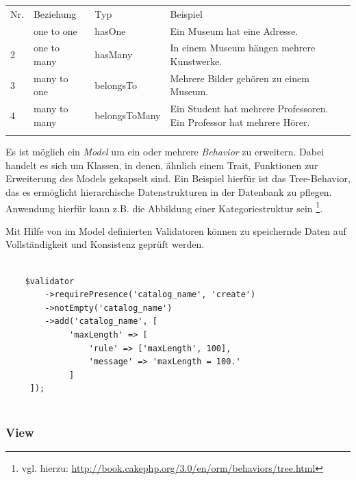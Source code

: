 	\begin{table}[!htbp]
		\begin{tabularx}{\textwidth}{p{1cm} X X p{8cm}}
			\cline{2-4}
			\rowcolor[HTML]{EFEFEF} 
			 Nr. & Beziehung & Typ & Beispiel \\ \cline{1-4} \addlinespace
			1 & one to one & hasOne & Ein Museum hat eine Adresse. \\
			2 & one to many & hasMany & In einem Museum hängen mehrere Kunstwerke. \\
			3 & many to one & belongsTo & Mehrere Bilder gehören zu einem Museum. \\  
			4 & many to many & belongsToMany & Ein Student hat mehrere Professoren. Ein Professor hat mehrere Hörer. \\ \addlinespace \cline{1-4}     
		\end{tabularx}
	\end{table}
		
	
	
	
	Es ist möglich ein \textit{Model} um ein oder mehrere \textit{Behavior} zu erweitern. Dabei handelt es sich um Klassen, in denen, ähnlich einem Trait, Funktionen zur Erweiterung des Models gekapselt sind. Ein Beispiel hierfür ist das Tree-Behavior, das es ermöglicht hierarchische Datenstrukturen in der Datenbank zu pflegen. Anwendung hierfür kann z.B. die Abbildung einer Kategoriestruktur sein \footnote{vgl. hierzu: \url{http://book.cakephp.org/3.0/en/orm/behaviors/tree.html}}.
	
	Mit Hilfe von im Model definierten Validatoren können zu speichernde Daten auf Vollständigkeit und Konsistenz geprüft werden. 

	\lstset{language=PHP}
	\begin{lstlisting}

	$validator
     	->requirePresence('catalog_name', 'create')
     	->notEmpty('catalog_name')
     	->add('catalog_name', [
	         'maxLength' => [
	             'rule' => ['maxLength', 100],
	             'message' => 'maxLength = 100.'
	         ]
     ]);
	
	\end{lstlisting}
	
	\subsubsection{View}
	
